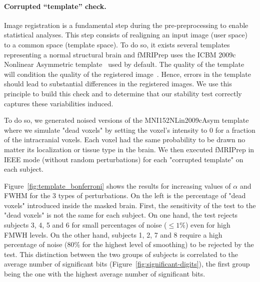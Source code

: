 \documentclass[lettersize,journal]{IEEEtran}
\newcommand{\fmriprep}{fMRIPrep\xspace}
\begin{document}
\paragraph{Corrupted ``template'' check.}

Image registration is a fundamental step during the pre-preprocessing to enable statistical analyses.
This step consists of realigning an input image (user space) to a common space (template space). To do so, it exists several templates representing a normal structural brain and \fmriprep uses the ICBM 2009c Nonlinear Asymmetric template~\cite{fonov2011unbiased} used by default. The quality of the template will condition the quality of the registered image~\cite{li2021moving}. Hence, errors in the template should lead to substantial differences in the registered images. We use this principle to build this check and to determine that our stability test correctly captures these variabilities induced.

To do so, we generated noised versions of the MNI152NLin2009cAsym template where we simulate "dead voxels" by setting the voxel's intensity to 0 for a fraction of the intracranial voxels. Each voxel had the same probability to be drawn no matter its localization or tissue type in the brain. We then executed \fmriprep in IEEE mode (without random perturbations) for each "corrupted template" on each subject.

Figure~\ref{fig:template_bonferroni} shows the results for increasing values of $\alpha$ and FWHM for the 3 types of perturbations. On the left is the percentage of "dead voxels" introduced inside the masked brain. First, the sensitivity of the test to the "dead voxels" is not the same for each subject. On one hand, the test rejects subjects 3, 4, 5 and 6 for small percentages of noise ($\leq 1\%$) even for high FMWH levels. On the other hand, subjects 1, 2, 7 and 8 require a high percentage of noise (80\% for the highest level of smoothing) to be rejected by the test. This distinction between the two groups of subjects is correlated to the average number of significant bits (Figure~\ref{fig:significant-digits}), the first group being the one with the highest average number of significant bits.
\end{document}
